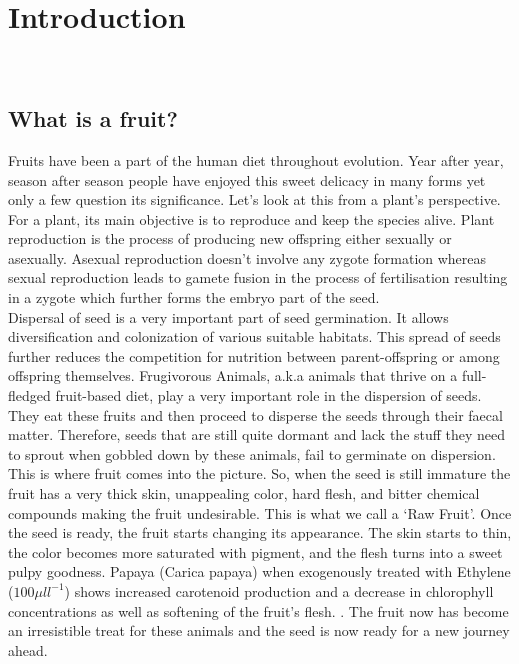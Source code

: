 \documentclass[10pt, a4paper]{article}
\begin{document}
\newpage
\Large
\tableofcontents

\newpage
\huge 
\section{Introduction} \\
\large
\subsection{What is a fruit?}
Fruits have been a part of the human diet throughout evolution. Year after year, season after season people have enjoyed this sweet delicacy in many forms yet only a few question its significance. Let’s look at this from a plant’s perspective. \\
For a plant, its main objective is to reproduce and keep the species alive. Plant reproduction is the process of producing new offspring either sexually or asexually. Asexual reproduction doesn’t involve any zygote formation whereas sexual reproduction leads to gamete fusion in the process of fertilisation resulting in a zygote which further forms the embryo part of the seed. \cite{Copeland1999} \\
Dispersal of seed is a very important part of seed germination. It allows diversification and colonization of various suitable habitats. This spread of seeds further reduces the competition for nutrition between parent-offspring or among offspring themselves. Frugivorous Animals, a.k.a animals that thrive on a full-fledged fruit-based diet, play a very important role in the dispersion of seeds. They eat these fruits and then proceed to disperse the seeds through their faecal matter. Therefore, seeds that are still quite dormant and lack the stuff they need to sprout when gobbled down by these animals, fail to germinate on dispersion. \\
This is where fruit comes into the picture. So, when the seed is still immature the fruit has a very thick skin, unappealing color, hard flesh, and bitter chemical compounds making the fruit undesirable. This is what we call a ‘Raw Fruit’. Once the seed is ready, the fruit starts changing its appearance. The skin starts to thin, the color becomes more saturated with pigment, and the flesh turns into a sweet pulpy goodness. Papaya (Carica papaya) when exogenously treated with Ethylene ($100 \mu l l^{-1}$) shows increased carotenoid production and a decrease in chlorophyll concentrations as well as softening of the fruit’s flesh. \cite{an1990storage}. The fruit now has become an irresistible treat for these animals and the seed is now ready for a new journey ahead. \\
\end{document}

